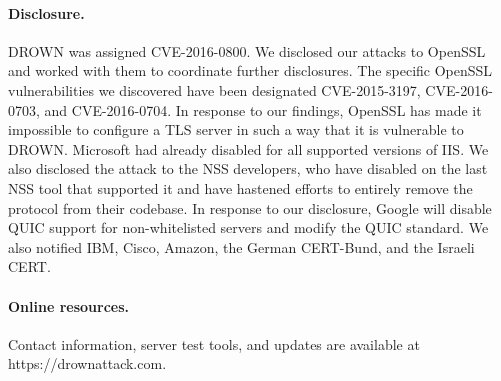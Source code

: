 \paragraph{Disclosure.}
DROWN was assigned CVE-2016-0800.
We disclosed our attacks to OpenSSL and worked with them to coordinate further disclosures.  The specific OpenSSL vulnerabilities we discovered have been designated CVE-2015-3197, CVE-2016-0703, and CVE-2016-0704.  In response to our findings, OpenSSL has
made it impossible to configure a TLS server in such a way that it is
vulnerable to DROWN\@.
Microsoft  had already disabled \ssltwo for all supported versions of IIS\@.
We also disclosed the attack to the NSS developers, who have disabled \ssltwo on the last NSS tool that supported it and have hastened efforts to entirely remove the protocol from their codebase.
In response to our disclosure, Google will disable QUIC support for non-whitelisted servers and modify the QUIC standard.
We also notified IBM, Cisco, Amazon, the German CERT-Bund, and the Israeli CERT\@.

\paragraph{Online resources.}
Contact information, server test tools, and updates are available at https://drownattack.com.
